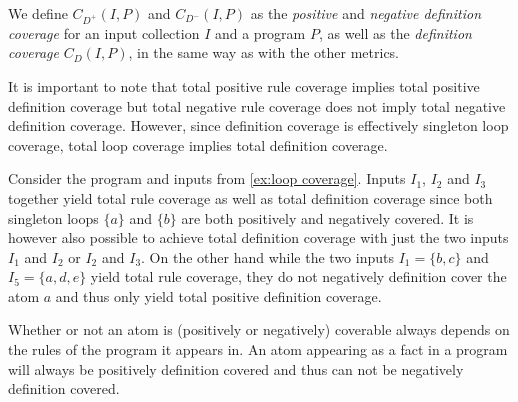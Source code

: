 We define \(C_{D^+}(I, P)\) and \(C_{D^-}(I, P)\) as the \emph{positive} and \emph{negative definition coverage} for an input collection $I$ and a program $P$, as well as the \emph{definition coverage} \(C_D(I, P)\), in the same way as with the other metrics.

It is important to note that total positive rule coverage implies total positive definition coverage but total negative rule coverage does not imply total negative definition coverage. However, since definition coverage is effectively singleton loop coverage, total loop coverage implies total definition coverage.

\begin{example}
\label{ex:definition coverage}
    Consider the program and inputs from \cref{ex:loop coverage}. Inputs $I_1$, $I_2$ and $I_3$ together yield total rule coverage as well as total definition coverage since both singleton loops \(\{a\}\) and \(\{b\}\) are both positively and negatively covered. It is however also possible to achieve total definition coverage with just the two inputs $I_1$ and $I_2$ or $I_2$ and $I_3$. On the other hand while the two inputs \(I_1 = \{b, c\}\) and \(I_5 = \{a, d, e\}\) yield total rule coverage, they do not negatively definition cover the atom $a$ and thus only yield total positive definition coverage.
\end{example}

Whether or not an atom is (positively or negatively) coverable always depends on the rules of the program it appears in. An atom appearing as a fact in a program will always be positively definition covered and thus can not be negatively definition covered.

